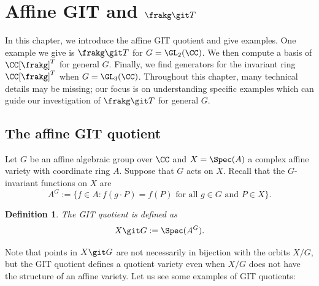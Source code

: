\documentclass[12pt]{amsart}
\theoremstyle{plain}
\newtheorem{definition}[theorem]{Definition}
\begin{document}
\newpage
\section{Affine GIT and $\frakg \git T$}
In this chapter, we introduce the affine GIT quotient and give examples.
One example we give is $\frakg \git T$ for $G = \GL_2(\CC)$.
We then compute a basis of $\CC[\frakg]^T$ for general $G$.
Finally, we find generators for the invariant ring $\CC[\frakg]^T$ when $G = \GL_3(\CC)$.
Throughout this chapter, many technical details may be missing;
our focus is on understanding specific examples which can guide our investigation of $\frakg \git T$ for general $G$.

\subsection{The affine GIT quotient}
Let $G$ be an affine algebraic group over $\CC$ and $X = \Spec(A)$ a complex affine variety with coordinate ring $A$.
Suppose that $G$ acts on $X$.
Recall that the $G$-invariant functions on $X$ are
$$A^G := \{f \in A : f(g \cdot P) = f(P) \text{ for all } g \in G \text{ and } P \in X\}.$$

\begin{definition}
The GIT quotient is defined as
$$X \git G := \Spec(A^G).$$
\end{definition}

Note that points in $X \git G$ are not necessarily in bijection with the orbits $X / G$, but the GIT quotient defines a quotient variety even when $X / G$ does not have the structure of an affine variety.
Let us see some examples of GIT quotients:
\end{document}
